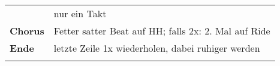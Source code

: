 \begin{tabular}{p{1.6cm}l}
                    & nur ein Takt                                                             \\
    \textbf{Chorus} & Fetter satter Beat auf HH; falls 2x: 2. Mal auf Ride                     \\
    \textbf{Ende}   & letzte Zeile 1x wiederholen, dabei ruhiger werden                        \\
                    &                                                                          \\
\end{tabular}
